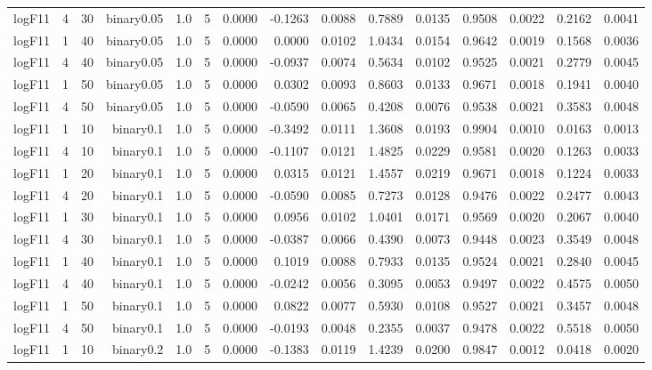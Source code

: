 \begin{longtable}{rrrrrrrrrrrrrrr}
  logF11 & 4 & 30 & binary0.05 & 1.0 & 5 & 0.0000 & -0.1263 & 0.0088 & 0.7889 & 0.0135 & 0.9508 & 0.0022 & 0.2162 & 0.0041 \\ 
  logF11 & 1 & 40 & binary0.05 & 1.0 & 5 & 0.0000 & 0.0000 & 0.0102 & 1.0434 & 0.0154 & 0.9642 & 0.0019 & 0.1568 & 0.0036 \\ 
  logF11 & 4 & 40 & binary0.05 & 1.0 & 5 & 0.0000 & -0.0937 & 0.0074 & 0.5634 & 0.0102 & 0.9525 & 0.0021 & 0.2779 & 0.0045 \\ 
  logF11 & 1 & 50 & binary0.05 & 1.0 & 5 & 0.0000 & 0.0302 & 0.0093 & 0.8603 & 0.0133 & 0.9671 & 0.0018 & 0.1941 & 0.0040 \\ 
  logF11 & 4 & 50 & binary0.05 & 1.0 & 5 & 0.0000 & -0.0590 & 0.0065 & 0.4208 & 0.0076 & 0.9538 & 0.0021 & 0.3583 & 0.0048 \\ 
  logF11 & 1 & 10 & binary0.1 & 1.0 & 5 & 0.0000 & -0.3492 & 0.0111 & 1.3608 & 0.0193 & 0.9904 & 0.0010 & 0.0163 & 0.0013 \\ 
  logF11 & 4 & 10 & binary0.1 & 1.0 & 5 & 0.0000 & -0.1107 & 0.0121 & 1.4825 & 0.0229 & 0.9581 & 0.0020 & 0.1263 & 0.0033 \\ 
  logF11 & 1 & 20 & binary0.1 & 1.0 & 5 & 0.0000 & 0.0315 & 0.0121 & 1.4557 & 0.0219 & 0.9671 & 0.0018 & 0.1224 & 0.0033 \\ 
  logF11 & 4 & 20 & binary0.1 & 1.0 & 5 & 0.0000 & -0.0590 & 0.0085 & 0.7273 & 0.0128 & 0.9476 & 0.0022 & 0.2477 & 0.0043 \\ 
  logF11 & 1 & 30 & binary0.1 & 1.0 & 5 & 0.0000 & 0.0956 & 0.0102 & 1.0401 & 0.0171 & 0.9569 & 0.0020 & 0.2067 & 0.0040 \\ 
  logF11 & 4 & 30 & binary0.1 & 1.0 & 5 & 0.0000 & -0.0387 & 0.0066 & 0.4390 & 0.0073 & 0.9448 & 0.0023 & 0.3549 & 0.0048 \\ 
  logF11 & 1 & 40 & binary0.1 & 1.0 & 5 & 0.0000 & 0.1019 & 0.0088 & 0.7933 & 0.0135 & 0.9524 & 0.0021 & 0.2840 & 0.0045 \\ 
  logF11 & 4 & 40 & binary0.1 & 1.0 & 5 & 0.0000 & -0.0242 & 0.0056 & 0.3095 & 0.0053 & 0.9497 & 0.0022 & 0.4575 & 0.0050 \\ 
  logF11 & 1 & 50 & binary0.1 & 1.0 & 5 & 0.0000 & 0.0822 & 0.0077 & 0.5930 & 0.0108 & 0.9527 & 0.0021 & 0.3457 & 0.0048 \\ 
  logF11 & 4 & 50 & binary0.1 & 1.0 & 5 & 0.0000 & -0.0193 & 0.0048 & 0.2355 & 0.0037 & 0.9478 & 0.0022 & 0.5518 & 0.0050 \\ 
  logF11 & 1 & 10 & binary0.2 & 1.0 & 5 & 0.0000 & -0.1383 & 0.0119 & 1.4239 & 0.0200 & 0.9847 & 0.0012 & 0.0418 & 0.0020 \\ 

\end{longtable}
